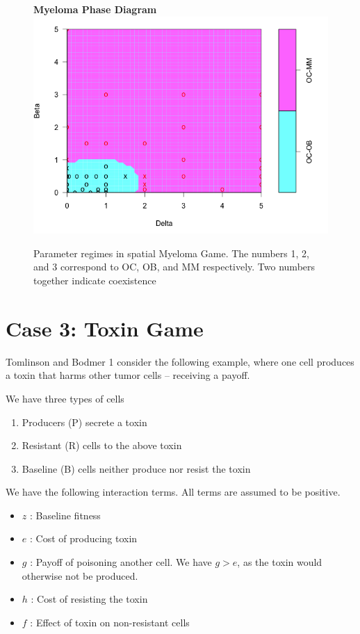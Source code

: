\documentclass[12pt]{report}
\begin{document}
\begin{figure}[!h]
\centering
\textbf{Myeloma Phase Diagram}
\includegraphics[width = 0.8 \linewidth]{Diagrams/dingli_phase}
\caption{Parameter regimes in spatial Myeloma Game. The numbers 1, 2, and 3 correspond to OC, OB, and MM respectively. Two numbers together indicate coexistence}
\end{figure}

\newpage

\section*{Case 3: Toxin Game}
Tomlinson and Bodmer \cite{TomBod}1 consider the following example, where one cell produces a toxin that harms other tumor cells -- receiving a payoff. 

We have three types of cells
\begin{enumerate}
\item Producers (P) secrete a toxin
\item Resistant (R) cells to the above toxin
\item Baseline (B) cells neither produce nor resist the toxin
\end{enumerate}

We have the following interaction terms. All terms are assumed to be positive.
\begin{itemize}
\item $z$ : Baseline fitness
\item $e$ : Cost of producing toxin
\item $g$ :  Payoff of poisoning another cell. We have $g > e$, as the toxin would otherwise not be produced.
\item $h$ :  Cost of resisting the toxin
\item $f$ : Effect of toxin on non-resistant cells
\end{itemize}
\end{document}
